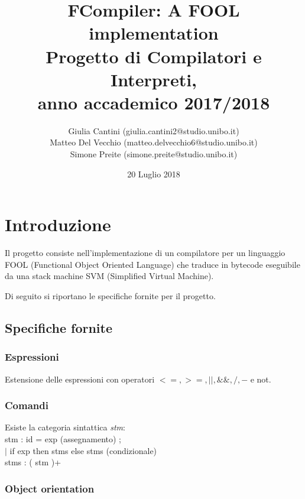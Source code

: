 \documentclass[a4paper]{article}   %
\begin{document}
\title{FCompiler: A FOOL implementation\\
Progetto di Compilatori e Interpreti,\\
          anno accademico 2017/2018}   %
\author{Giulia Cantini (giulia.cantini2@studio.unibo.it)\\
        Matteo Del Vecchio (matteo.delvecchio6@studio.unibo.it)\\
        Simone Preite (simone.preite@studio.unibo.it)}
\date{20 Luglio 2018}    %
\maketitle

\tableofcontents

\section{Introduzione}

Il progetto consiste nell'implementazione di un compilatore per un linguaggio FOOL (Functional Object Oriented Language) che traduce in bytecode
eseguibile da una stack machine SVM (Simplified Virtual Machine).

Di seguito si riportano le specifiche fornite per il progetto.

\subsection{Specifiche fornite}

\subsubsection{Espressioni}

Estensione delle espressioni con operatori $<=, >=, ||, \&\&, /, - $
   e not.

\subsubsection{Comandi}

Esiste la categoria sintattica \textit{stm}:\\

stm : 	id = exp (assegnamento) ; \\
	$|$ if exp then { stms } else { stms } (condizionale)\\

stms :  ( stm )+

\subsubsection{Object orientation}
\end{document}
